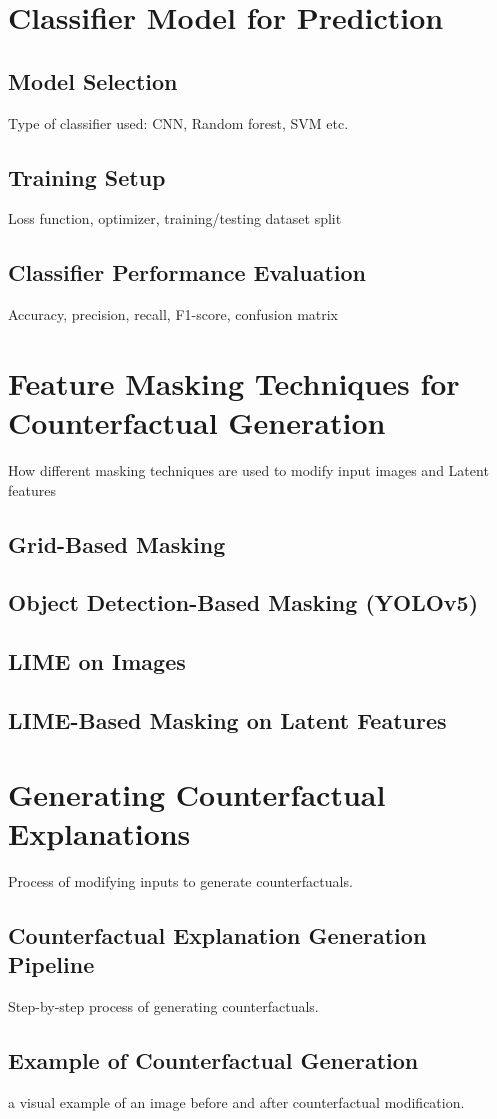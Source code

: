 \section{Classifier Model for Prediction}

\subsection{Model Selection}
Type of classifier used: CNN, Random forest, SVM etc.

\subsection{Training Setup}
Loss function, optimizer, training/testing dataset split

\subsection{Classifier Performance Evaluation}
Accuracy, precision, recall, F1-score, confusion matrix


\section{Feature Masking Techniques for Counterfactual Generation}
How different masking techniques are used to modify input images and Latent features

\subsection{ Grid-Based Masking}

\subsection{Object Detection-Based Masking (YOLOv5)}

\subsection{LIME on Images}

\subsection{LIME-Based Masking on Latent Features}




\section{Generating Counterfactual Explanations}
Process of modifying inputs to generate counterfactuals.

\subsection{Counterfactual Explanation Generation Pipeline}
Step-by-step process of generating counterfactuals.


\subsection{Example of Counterfactual Generation}
a visual example of an image before and after counterfactual modification.